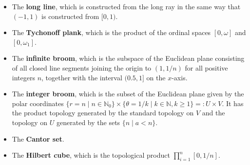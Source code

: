 \documentclass[12pt]{article}
\newcommand{\N}{\mathbb{N}}
\begin{document}
\begin{itemize}
\item The \textbf{long line}, which is constructed from the long ray in the same way that $(-1,1)$ is constructed from $[0,1)$.
\item The \textbf{Tychonoff plank}, which is the product of the ordinal spaces $[0,\omega]$ and $[0, \omega_1]$.
\item The \textbf{infinite broom}, which is the subspace of the Euclidean plane consisting of all closed line segments joining the origin to $(1, 1/n)$ for all positive integers $n$, together with the interval $(0.5, 1]$ on the $x$-axis.
\item The \textbf{integer broom}, which is the subset of the Euclidean plane given by the polar coordinates $\{r = n \mid n \in \N_0\} \times \{\theta = 1/k \mid k \in \N, k \geq 1\} =: U \times V$. It has the product topology generated by the standard topology on $V$ and the topology on $U$ generated by the sets $\{n \mid a < n\}$.
\item The \textbf{Cantor set}.
\item The \textbf{Hilbert cube}, which is the topological product $\prod_{i=1}^n [0,1/n]$.
\end{itemize}
\end{document}
